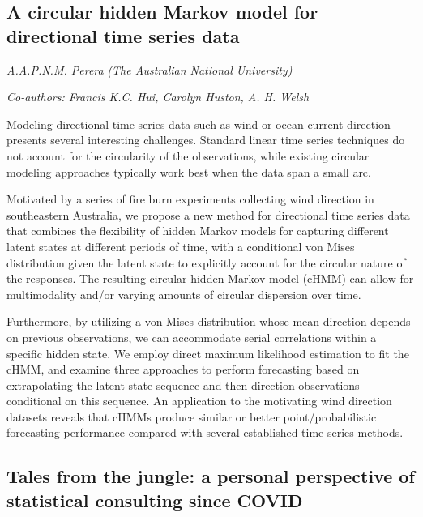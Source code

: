 \documentclass[
]{scrreprt}
\begin{document}
\subsection{A circular hidden Markov model for directional time series
data}\label{a-circular-hidden-markov-model-for-directional-time-series-data}

\emph{A.A.P.N.M. Perera} \emph{(The Australian
National University)}

\emph{Co-authors: Francis K.C. Hui, Carolyn Huston, A. H. Welsh}

\setlength{\parskip}{0.5em}

Modeling directional time series data such as wind or ocean current
direction presents several interesting challenges. Standard linear time
series techniques do not account for the circularity of the
observations, while existing circular modeling approaches typically work
best when the data span a small arc.

Motivated by a series of fire burn experiments collecting wind direction
in southeastern Australia, we propose a new method for directional time
series data that combines the flexibility of hidden Markov models for
capturing different latent states at different periods of time, with a
conditional von Mises distribution given the latent state to explicitly
account for the circular nature of the responses. The resulting circular
hidden Markov model (cHMM) can allow for multimodality and/or varying
amounts of circular dispersion over time.

Furthermore, by utilizing a von Mises distribution whose mean direction
depends on previous observations, we can accommodate serial correlations
within a specific hidden state. We employ direct maximum likelihood
estimation to fit the cHMM, and examine three approaches to perform
forecasting based on extrapolating the latent state sequence and then
direction observations conditional on this sequence. An application to
the motivating wind direction datasets reveals that cHMMs produce
similar or better point/probabilistic forecasting performance compared
with several established time series methods.

\subsection{Tales from the jungle: a personal perspective of statistical
consulting since
COVID}\label{tales-from-the-jungle-a-personal-perspective-of-statistical-consulting-since-covid}
\end{document}
